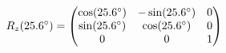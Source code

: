 \documentclass[preview]{standalone}
\begin{document}
\begin{align*}
\special{dvisvgm:raw <g id='unique000'>}R_z(25.6^\circ) = \begin{pmatrix} \cos(25.6^\circ) & -\sin(25.6^\circ) & 0 \\ \sin(25.6^\circ) & \cos(25.6^\circ) & 0 \\ 0 & 0 & 1 \end{pmatrix}\special{dvisvgm:raw </g>}
\end{align*}
\end{document}
